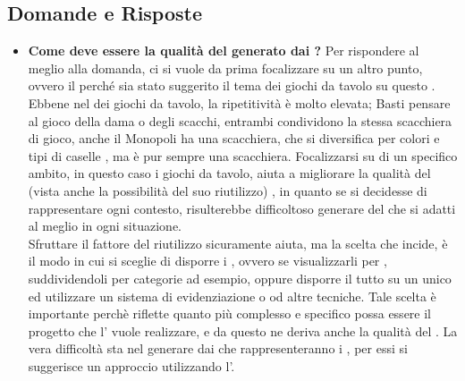 	  \subsection{Domande e Risposte}
	   \begin{itemize}
	   
	   	\item 
	   		\textbf{Come deve essere la qualità del  generato dai ?}
	    	\justifying     		
Per rispondere al meglio alla domanda, ci si vuole da prima focalizzare su un altro punto, ovvero il perché sia stato suggerito il tema dei giochi da tavolo su questo .\\
Ebbene nel  dei giochi da tavolo, la ripetitività è molto elevata; Basti pensare al gioco della dama o degli scacchi, entrambi condividono la stessa scacchiera di gioco, anche il Monopoli ha una scacchiera, che si diversifica per colori e tipi di caselle , ma è pur sempre una scacchiera. Focalizzarsi su di un specifico ambito, in questo caso i giochi da tavolo, aiuta a migliorare la qualità del  (vista anche la possibilità del suo riutilizzo) , in quanto se si decidesse di rappresentare ogni contesto, risulterebbe difficoltoso generare del  che si adatti al meglio in ogni situazione.\\Sfruttare il fattore del riutilizzo sicuramente aiuta, ma la scelta che incide, è il modo in cui si sceglie di disporre i , ovvero se visualizzarli per  , suddividendoli per categorie ad esempio, oppure disporre il tutto su un unico  ed utilizzare un sistema di evidenziazione o  od altre tecniche. Tale scelta è importante perchè riflette quanto più complesso e specifico possa essere il progetto che l' vuole realizzare, e da questo ne deriva anche la qualità del .
      		La vera difficoltà sta nel generare  dai  che rappresenteranno i , per essi si suggerisce un approccio utilizzando l'.\\


\end{itemize}
